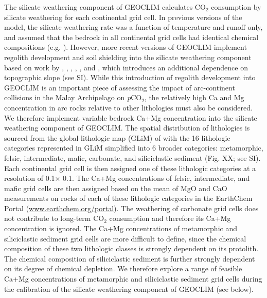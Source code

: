 \documentclass[11pt,letterpaper]{article}
\newcommand{\degrees}{\textdegree\xspace}
\newcommand{\pCOtwo}{\textit{p}CO$_{2}$\xspace}
\newcommand{\COtwo}{CO$_{2}$\xspace}
\begin{document}
The silicate weathering component of GEOCLIM calculates \COtwo consumption by silicate weathering for each continental grid cell. In previous versions of the model, the silicate weathering rate was a function of temperature and runoff only, and assumed that the bedrock in all continental grid cells had identical chemical compositions (e.g. \citealp{Godderis2014a}). However, more recent versions of GEOCLIM implement regolith development and soil shielding into the silicate weathering component based on work by \citet{Heimsath1997a}, \citet{Gabet2009a}, \citet{West2012a}, \citet{Carretier2014a}, \citet{Godderis2017b}, and \citet{Maffre2018a}, which introduces an additional dependence on topographic slope (see SI). While this introduction of regolith development into GEOCLIM is an important piece of assessing the impact of arc-continent collisions in the Malay Archipelago on \pCOtwo, the relatively high Ca and Mg concentration in arc rocks relative to other lithologies must also be considered. We therefore implement variable bedrock Ca+Mg concentration into the silicate weathering component of GEOCLIM. The spatial distribution of lithologies is sourced from the global lithologic map (GLiM) of \citet{Hartmann2012a} with the 16 lithologic categories represented in GLiM simplified into 6 broader categories: metamorphic, felsic, intermediate, mafic, carbonate, and siliciclastic sediment (Fig. XX; see SI). Each continental grid cell is then assigned one of these lithologic categories at a resolution of 0.1\degrees $\times$ 0.1\degrees. The Ca+Mg concentrations of felsic, intermediate, and mafic grid cells are then assigned based on the mean of MgO and CaO measurements on rocks of each of these lithologic categories in the EarthChem Portal (\url{www.earthchem.org/portal}). The weathering of carbonate grid cells does not contribute to long-term \COtwo consumption and therefore its Ca+Mg concentration is ignored. The Ca+Mg concentrations of metamorphic and siliciclastic sediment grid cells are more difficult to define, since the chemical composition of these two lithologic classes is strongly dependent on its protolith. The chemical composition of siliciclastic sediment is further strongly dependent on its degree of chemical depletion. We therefore explore a range of feasible Ca+Mg concentrations of metamorphic and siliciclastic sediment grid cells during the calibration of the silicate weathering component of GEOCLIM (see below).
\end{document}
